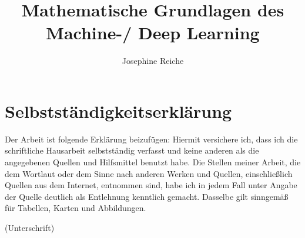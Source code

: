 \documentclass[a4paper]{scrreprt}
\begin{document}
\author{Josephine Reiche}
\title{Mathematische Grundlagen des Machine-/ Deep Learning}
\maketitle
\tableofcontents
\chapter{Selbstständigkeitserklärung}
Der Arbeit ist folgende Erklärung beizufügen:
Hiermit versichere ich, dass ich die schriftliche Hausarbeit selbstständig verfasst und keine
anderen als die angegebenen Quellen und Hilfsmittel benutzt habe. Die Stellen meiner Arbeit,
die dem Wortlaut oder dem Sinne nach anderen Werken und Quellen, einschließlich Quellen
aus dem Internet, entnommen sind, habe ich in jedem Fall unter Angabe der Quelle deutlich
als Entlehnung kenntlich gemacht. Dasselbe gilt sinngemäß für Tabellen, Karten und
Abbildungen.

(Unterschrift)



\end{document}
